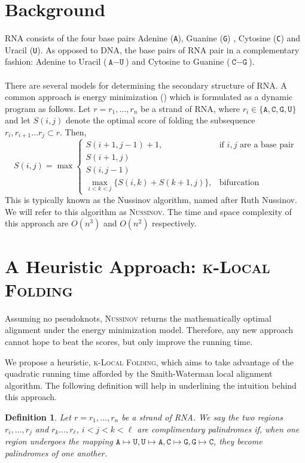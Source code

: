 \documentclass[11pt]{article}
\newcommand{\A}{\texttt{A}}
\newcommand{\G}{\texttt{G}}
\newcommand{\U}{\texttt{U}}
\newcommand{\C}{\texttt{C}}
\newcommand{\klf}{\textsc{k-Local Folding}\xspace}
\newcommand{\rf}{\textsc{Nussinov}\xspace}
\newtheorem{definition}{Definition}
\newcommand{\s}{\\\\}
\begin{document}
\section{Background}
RNA consists of the four base pairs Adenine (\A), Guanine (\G) , Cytosine (\C) and Uracil (\U). As opposed to DNA, the base pairs of RNA pair in a complementary fashion: Adenine to Uracil ($\A-\U$) and Cytosine to Guanine ($\C-\G$). \s

There are several models for determining the secondary structure of RNA.  A common approach is energy minimization (\cite{three}) which is formulated as a dynamic program as follows. Let $r=r_1,\ldots,r_n$ be a strand of RNA, where $r_i\in\{\A,\C,\G,\U\}$ and let $S(i,j)$ denote the optimal score of folding the subsequence $r_i,r_{i+1}\ldots r_j\subset r$. Then, 
\[S(i,j)=\max\begin{cases}
S(i+1,j-1)+1,&\text{if }i,j\text{ are a base pair}\\
S(i+1,j)\\
S(i,j-1)\\
\max_{i<k<j}\{S(i,k)+S(k+1,j)\},&\text{bifurcation}
\end{cases}\]
This is typically known as the Nussinov algorithm, named after Ruth Nussinov. We will refer to this algorithm as \rf. The time and space complexity of this approach are $O(n^3)$ and $O(n^2)$ respectively.


\section{A Heuristic Approach: \klf}
Assuming no pseudoknots, \rf returns the mathematically optimal alignment under the energy minimization model. Therefore, any new approach cannot hope to beat the scores, but only improve the running time.

We propose a heuristic, \klf, which aims to take advantage of the quadratic running time afforded by the Smith-Waterman local alignment algorithm. The following definition will help in underlining the intuition behind this approach. 

\begin{definition}
Let $r=r_1,\ldots,r_n$ be a strand of RNA. 
We say the two regions $r_i,\ldots,r_j$ and $r_k\ldots,r_\ell$, $i<j<k<\ell$ are complimentary palindromes if, when one region undergoes the mapping $\A\mapsto \U, \U\mapsto\A, \C\mapsto\G, \G\mapsto\C$, they become palindromes of one another.  
\end{definition}
\end{document}
